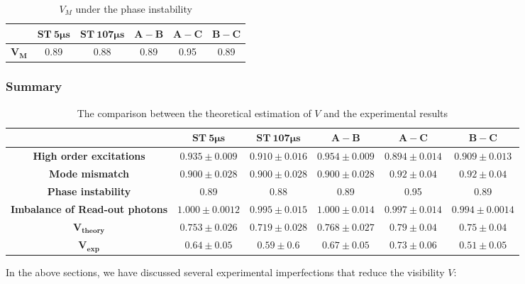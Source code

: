 \documentclass[aps,reprint,showpacs,superscriptaddress]{revtex4-2}
\begin{document}
\begin{table*}[!htbp]
	\caption{$V_M$ under the phase instability}
	\label{tab: phase instability on V}
	\renewcommand\arraystretch{1.2}
	\begin{ruledtabular}
	\begin{tabular}{cccccc}
		& $\bm{ST\  5\mu s}$ &  $\bm{ST \ 107\mu s}$ & $\bm{A-B}$& $\bm{A-C}$ & $\bm{B-C}$\\
		\hline
		$\bm{V_M}$ &0.89&0.88&0.89&0.95&0.89\\
	\end{tabular}
\end{ruledtabular}
\end{table*}

\subsubsection{Summary}
\begin{table*}[!htbp]
	\caption{The comparison between the theoretical estimation of $V$ and the experimental results }
	\label{tab: theory and experiment of V}
	\renewcommand\arraystretch{1.2}
	\begin{ruledtabular}
	\begin{tabular}{cccccc}
		& $\bm{ST\  5\mu s}$ &  $\bm{ST \ 107\mu s}$ & $\bm{A-B}$& $\bm{A-C}$ & $\bm{B-C}$\\
		\hline
		\textbf{High order excitations} &$0.935\pm0.009$&$0.910\pm 0.016$&$0.954\pm0.009$&$0.894\pm0.014$&$0.909\pm0.013$\\
		\textbf{Mode mismatch} &$0.900\pm0.028$&$0.900\pm 0.028$&$0.900\pm0.028$&$0.92\pm0.04$&$0.92\pm0.04$\\
	    \textbf{Phase instability} &0.89&0.88&0.89&0.95&0.89\\
		\textbf{Imbalance of Read-out photons} &$1.000\pm0.0012$&$0.995\pm 0.015$&$1.000\pm0.014$&$0.997\pm0.014$&$0.994\pm0.0014$\\
		$\bm{V_{theory}}$ &$0.753\pm0.026$&$0.719\pm0.028$&$0.768\pm0.027$&$0.79\pm0.04$&$0.75\pm0.04$\\
		$\bm{V_{exp}}$ &$0.64\pm0.05$&$0.59\pm0.6$&$0.67\pm0.05$&$0.73\pm0.06$&$0.51\pm0.05$\\
	\end{tabular}
\end{ruledtabular}
\end{table*}

In the above sections, we have discussed several experimental imperfections that reduce the visibility $V$:
\end{document}
